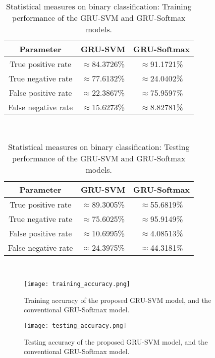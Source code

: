 \begin{table}
\centering
\caption{Statistical measures on binary classification: Training performance of the GRU-SVM and GRU-Softmax models.}
	\begin{tabular}{ccc}
	\toprule
		Parameter & GRU-SVM & GRU-Softmax\\
	\midrule
		True positive rate & $\approx$84.3726\% & $\approx$91.1721\% \\
		True negative rate & $\approx$77.6132\% & $\approx$24.0402\% \\
		False positive rate & $\approx$22.3867\% & $\approx$75.9597\% \\
		False negative rate & $\approx$15.6273\% & $\approx$8.82781\% \\
	\bottomrule
	\end{tabular}\\
	\label{statistical-measures-training}
\end{table}

\begin{table}
\centering
\caption{Statistical measures on binary classification: Testing performance of the GRU-SVM and GRU-Softmax models.}
	\begin{tabular}{ccc}
	\toprule
		Parameter & GRU-SVM & GRU-Softmax\\
	\midrule
		True positive rate & $\approx$89.3005\% & $\approx$55.6819\% \\
		True negative rate & $\approx$75.6025\% & $\approx$95.9149\% \\
		False positive rate & $\approx$10.6995\% & $\approx$4.08513\% \\
		False negative rate & $\approx$24.3975\% & $\approx$44.3181\% \\
	\bottomrule
	\end{tabular}\\
	\label{statistical-measures-testing}
\end{table}

\begin{figure}
\centering
	\texttt{[image: training\_accuracy.png]}
	\caption{Training accuracy of the proposed GRU-SVM model, and the conventional GRU-Softmax model.}
	\label{training-accuracy}
\endminipage\hfill
\end{figure}

\begin{figure}
\centering
	\texttt{[image: testing\_accuracy.png]}
	\caption{Testing accuracy of the proposed GRU-SVM model, and the conventional GRU-Softmax model.}
	\label{testing-accuracy}
\endminipage\hfill
\end{figure}

